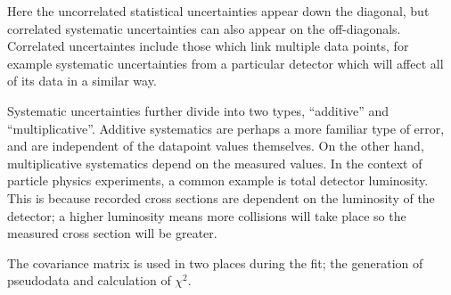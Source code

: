 Here the uncorrelated statistical uncertainties appear down the diagonal, but correlated
systematic uncertainties can also appear on the off-diagonals. Correlated uncertaintes include
those which link multiple data points, for example systematic uncertainties from a particular
detector which will affect all of its data in a similar way.

Systematic uncertainties further divide into two types, ``additive'' and ``multiplicative''.
Additive systematics are perhaps a more familiar type of error, and are independent of the
datapoint values themselves. On the other hand,  multiplicative systematics depend on the measured values. In the context of particle physics 
experiments, a common example is total detector luminosity. This is because recorded cross
sections are dependent on the luminosity of the detector; a higher luminosity means more
collisions will take place so the measured cross section will be greater.

The covariance matrix is used in two places during the fit; the generation of pseudodata and calculation
of $\chi^2$.
